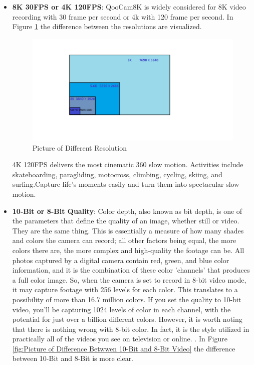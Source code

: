 \begin{itemize}
    \item  \textbf{8K 30FPS or 4K 120FPS}:
QooCam8K is widely considered for 8K video recording with 30 frame per second or 4k with 120 frame per second.
In Figure \ref{fig:Different Resolution} the difference between the resolutions are visualized.
\begin{figure}[H]
  \centering
  \includegraphics[width= 1.2\textwidth]{Figures/8K.PNG}
  \caption[Picture of Different resolutions]{Picture of Different Resolution}
  \label{fig:Different Resolution}
\end{figure}
 \noindent 4K 120FPS delivers the most cinematic 360 slow motion. Activities include skateboarding, paragliding, motocross, climbing, cycling, skiing, and surfing.Capture life's moments easily and turn them into spectacular slow motion.
    \item \textbf{10-Bit or 8-Bit Quality}:
    Color depth, also known as bit depth, is one of the parameters that define the quality of an image, whether still or video. They are the same thing. This is essentially a measure of how many shades and colors the camera can record; all other factors being equal, the more colors there are, the more complex and high-quality the footage can be. All photos captured by a digital camera contain red, green, and blue color information, and it is the combination of these color 'channels' that produces a full color image. So, when the camera is set to record in 8-bit video mode, it may capture footage with 256 levels for each color. This translates to a possibility of more than 16.7 million colors. If you set the quality to 10-bit video, you'll be capturing 1024 levels of color in each channel, with the potential for just over a billion different colors. However, it is worth noting that there is nothing wrong with 8-bit color. In fact, it is the style utilized in practically all of the videos you see on television or online.
 \cite{10Bit}. In Figure \ref{fig:Picture of Difference Betwwen 10-Bit and 8-Bit Video} the difference between 10-Bit and 8-Bit is more clear. 

\end{itemize}
